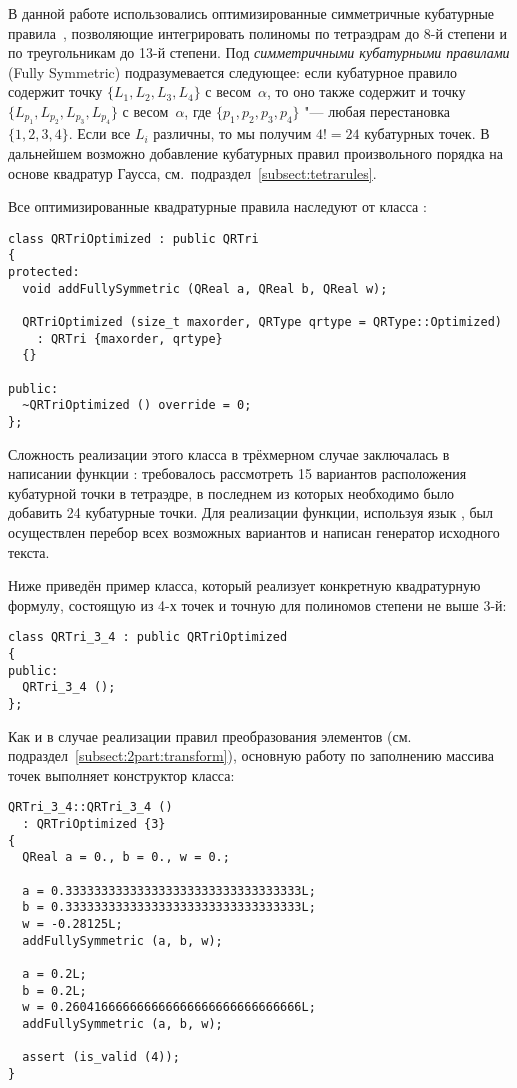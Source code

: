 В данной работе использовались оптимизированные симметричные кубатурные правила~\cite{CubatureRules}, позволяющие интегрировать полиномы по тетраэдрам до 8-й степени и по треугольникам до 13-й степени. Под \textit{симметричными кубатурными правилами} (Fully Symmetric) подразумевается следующее: если кубатурное правило содержит точку \(\{L_1, L_2, L_3, L_4\}\) с весом~\(\alpha\), то оно также содержит и точку \(\{L_{p_1}, L_{p_2}, L_{p_3}, L_{p_4}\}\) с весом~\(\alpha\), где \(\{p_1, p_2, p_3, p_4\}\) "--- любая перестановка \(\{1, 2, 3, 4\}\). Если все \(L_i\) различны, то мы получим \(4! = 24\) кубатурных точек. В дальнейшем возможно добавление кубатурных правил произвольного порядка на основе квадратур Гаусса, см.~подраздел~\ref{subsect:tetrarules}.

Все оптимизированные квадратурные правила наследуют от класса :

\begin{verbatim}
class QRTriOptimized : public QRTri
{
protected:
  void addFullySymmetric (QReal a, QReal b, QReal w);

  QRTriOptimized (size_t maxorder, QRType qrtype = QRType::Optimized)
    : QRTri {maxorder, qrtype}
  {}

public:
  ~QRTriOptimized () override = 0;
};
\end{verbatim}

Сложность реализации этого класса в трёхмерном случае заключалась в написании функции : требовалось рассмотреть 15 вариантов расположения кубатурной точки в тетраэдре, в последнем из которых необходимо было добавить 24 кубатурные точки. Для реализации функции, используя язык , был осуществлен перебор всех возможных вариантов и написан генератор исходного текста.

Ниже приведён пример класса, который реализует конкретную квадратурную формулу, состоящую из 4-х точек и точную для полиномов степени не выше 3-й:

\begin{verbatim}
class QRTri_3_4 : public QRTriOptimized
{
public:
  QRTri_3_4 ();
};
\end{verbatim}

Как и в случае реализации правил преобразования элементов (см. подраздел~\ref{subsect:2part:transform}), основную работу по заполнению массива точек выполняет конструктор класса:

\begin{verbatim}
QRTri_3_4::QRTri_3_4 ()
  : QRTriOptimized {3}
{
  QReal a = 0., b = 0., w = 0.;

  a = 0.333333333333333333333333333333333L;
  b = 0.333333333333333333333333333333333L;
  w = -0.28125L;
  addFullySymmetric (a, b, w);

  a = 0.2L;
  b = 0.2L;
  w = 0.260416666666666666666666666666666L;
  addFullySymmetric (a, b, w);

  assert (is_valid (4));
}
\end{verbatim}



